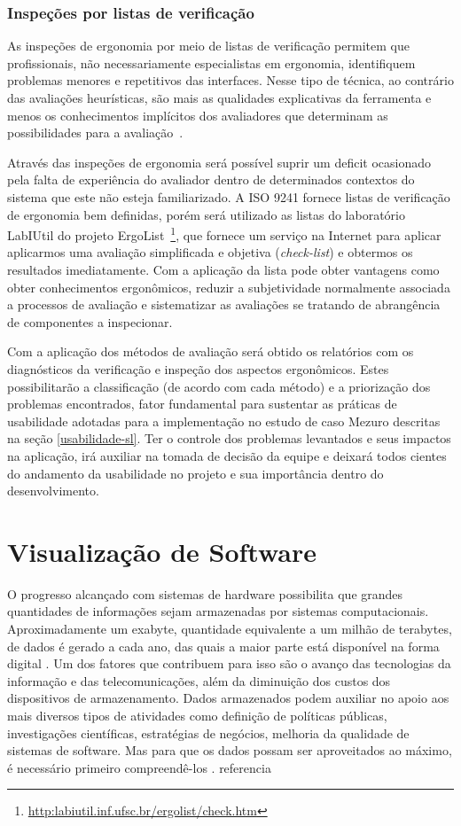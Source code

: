 \subsubsection{Inspeções por listas de verificação}
\label{inspeções-listas}
As inspeções de ergonomia por meio de listas de verificação permitem que
profissionais, não necessariamente especialistas em ergonomia, identifiquem
problemas menores e repetitivos das interfaces.
%
Nesse tipo de técnica, ao contrário das avaliações heurísticas, são mais as
qualidades explicativas da ferramenta e menos os conhecimentos implícitos dos
avaliadores que determinam as possibilidades para a avaliação~\cite{cybis2010}.

%
Através das inspeções de ergonomia será possível suprir um deficit ocasionado
pela falta de experiência do avaliador dentro de determinados contextos do
sistema que este não esteja familiarizado.
%
A ISO 9241 fornece listas de verificação de ergonomia bem definidas, porém será
utilizado as listas do laboratório LabIUtil do projeto
ErgoList~\footnote{\url{http:labiutil.inf.ufsc.br/ergolist/check.htm}},
que fornece um serviço na Internet para aplicar aplicarmos uma avaliação
simplificada e objetiva (\textit{check-list}) e obtermos os resultados
imediatamente.
%
Com a aplicação da lista pode obter vantagens como obter conhecimentos
ergonômicos, reduzir a subjetividade normalmente associada a processos de
avaliação e sistematizar as avaliações se tratando de abrangência de componentes
a inspecionar.

Com a aplicação dos métodos de avaliação será obtido os relatórios com os diagnósticos da verificação e inspeção dos aspectos ergonômicos. Estes possibilitarão a classificação (de acordo com cada método) e a priorização dos problemas encontrados, fator fundamental para sustentar as práticas de usabilidade adotadas para a implementação no estudo de caso Mezuro descritas na seção \ref{usabilidade-sl}. Ter o controle dos problemas levantados e seus impactos na aplicação, irá auxiliar na tomada de decisão da equipe e deixará todos cientes do andamento da usabilidade no projeto e sua importância dentro do desenvolvimento. 

\section{Visualização de Software}

O progresso alcançado com sistemas de hardware possibilita que grandes quantidades de informações sejam armazenadas por sistemas computacionais. Aproximadamente um exabyte, quantidade equivalente a um milhão de terabytes, de dados é gerado a cada ano, das quais a maior parte está disponível na forma digital \cite{keim2002information}. Um dos fatores que contribuem para isso são o avanço das tecnologias da informação e das telecomunicações, além da diminuição dos custos dos dispositivos de armazenamento. Dados armazenados podem auxiliar no apoio aos mais diversos tipos de atividades como definição de políticas públicas, investigações científicas, estratégias de negócios, melhoria da qualidade de sistemas de software. Mas para que os dados possam ser aproveitados ao máximo, é necessário primeiro compreendê-los \cite{heer2012interactive}. referencia

